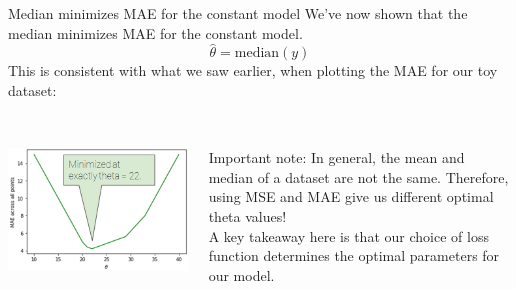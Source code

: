\documentclass[aspectratio=169]{../latex_main/tntbeamer}  %
\begin{document}
	
	\begin{frame}{Median minimizes MAE for the constant model}
	    We’ve now shown that the median minimizes MAE for the constant model.
	    \begin{equation*}
	        \hat{\theta} = \text{median}(y)
	    \end{equation*}
	    This is consistent with what we saw earlier, when plotting the MAE for our toy dataset: 
	    \begin{columns}
	        \begin{column}{.5\textwidth}
	                \\
	                \includegraphics[scale=.4]{Bild43}
	        \end{column}
	        
	        
	        \begin{column}{.5\textwidth}
	              \vspace{.2cm}\\
	              Important note: In general, the mean and median of a dataset are not the same. Therefore, using MSE and MAE give us different optimal theta values! \\
                  A key takeaway here is that our choice of loss function determines the optimal parameters for our model.
  
	        \end{column}
	    \end{columns}
	\end{frame}
	
	
	
\end{document}
